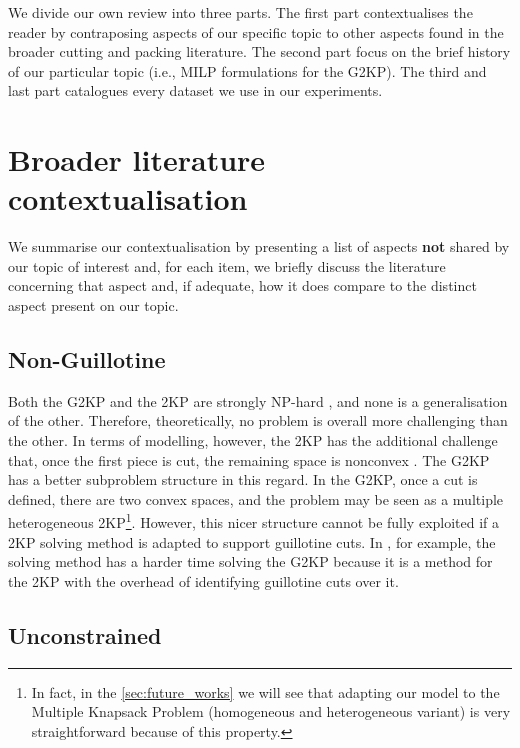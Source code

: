 \documentclass[ppgc,tese,english,formais,babel]{iiufrgs}
\begin{document}
We divide our own review into three parts. The first part contextualises the reader by contraposing aspects of our specific topic to other aspects found in the broader cutting and packing literature. The second part focus on the brief history of our particular topic (i.e., MILP formulations for the G2KP). The third and last part catalogues every dataset we use in our experiments.

\section{Broader literature contextualisation}

We summarise our contextualisation by presenting a list of aspects \textbf{not} shared by our topic of interest and, for each item, we briefly discuss the literature concerning that aspect and, if adequate, how it does compare to the distinct aspect present on our topic.

\subsection{Non-Guillotine}

Both the G2KP and the 2KP are strongly NP-hard \citep{iori:2020}, and none is a generalisation of the other.
Therefore, theoretically, no problem is overall more challenging than the other.
In terms of modelling, however, the 2KP has the additional challenge that, once the first piece is cut, the remaining space is nonconvex \citep{fekete:1997}.
The G2KP has a better subproblem structure in this regard.
In the G2KP, once a cut is defined, there are two convex spaces, and the problem may be seen as a multiple heterogeneous 2KP\footnote{In fact, in the \cref{sec:future_works} we will see that adapting our model to the Multiple Knapsack Problem (homogeneous and heterogeneous variant) is very straightforward because of this property.}.
However, this nicer structure cannot be fully exploited if a 2KP solving method is adapted to support guillotine cuts.
In \citet{nascimento:2019}, for example, the solving method has a harder time solving the G2KP because it is a method for the 2KP with the overhead of identifying guillotine cuts over it.

\subsection{Unconstrained}
\end{document}
